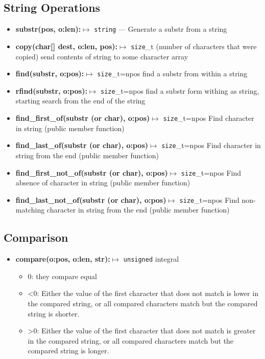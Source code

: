 \documentclass{report}
\begin{document}
    \subsection{String Operations}
    \begin{itemize}
        \item \textbf{substr(pos, o:len):}$\mapsto$ \texttt{string} --- Generate a substr from a string 
        \item \textbf{copy(char[] dest, o:len, pos):}$\mapsto$ \texttt{size}\_t (number of characters that were copied) send contents of string to some character array
        \item \textbf{find(substr, o:pos):}$\mapsto$ \texttt{size}\_t=npos find a substr from within a string
        \item \textbf{rfind(substr, o:pos):}$\mapsto$ \texttt{size}\_t=npos  find a substr form withing as string, starting search from the end of the string
        \item \textbf{find\_first\_of(substr (or char), o:pos)}$\mapsto$ \texttt{size}\_t=npos Find character in string (public member function)
        \item \textbf{find\_last\_of(substr (or char), o:pos)}$\mapsto$ \texttt{size}\_t=npos	Find character in string from the end (public member function)
        \item \textbf{find\_first\_not\_of(substr (or char), o:pos)}$\mapsto$ \texttt{size}\_t=npos	Find absence of character in string (public member function)
        \item \textbf{find\_last\_not\_of(substr (or char), o:pos)}$\mapsto$ \texttt{size}\_t=npos	Find non-matching character in string from the end (public member function)
    \end{itemize}
    \bigbreak \noindent 
    \subsection{Comparison}
    \begin{itemize}
        \item \textbf{compare(o:pos, o:len, str):}$\mapsto$ \texttt{unsigned} integral
            \begin{itemize}
                \item 0: they compare equal 
                \item <0: Either the value of the first character that does not match is lower in the compared string, or all compared characters match but the compared string is shorter.
                \item >0: Either the value of the first character that does not match is greater in the compared string, or all compared characters match but the compared string is longer.
            \end{itemize}
    \end{itemize}
\end{document}
